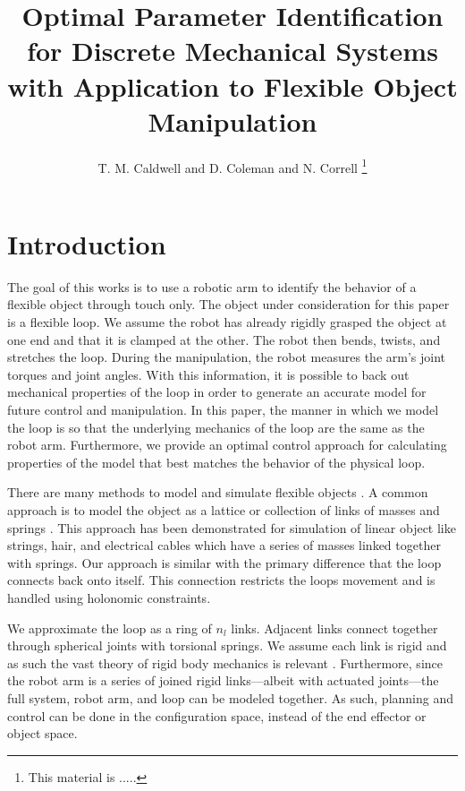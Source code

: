 \documentclass[letterpaper, 10pt, conference]{ieeeconf}
\title{Optimal Parameter Identification for Discrete Mechanical Systems with Application to Flexible Object Manipulation}
\author{T. M. Caldwell and  D. Coleman and N. Correll%
\thanks{
This material is .....}%
}
\begin{document}
\maketitle

\begin{abstract}




\end{abstract}

\section{Introduction}
The goal of this works is to use a robotic arm to identify the behavior of a flexible object through touch only.  The object under consideration for this paper is a flexible loop.  We assume the robot has already rigidly grasped the object at one end and that it is clamped at the other.  The robot then bends, twists, and stretches the loop.  During the manipulation, the robot measures the arm's joint torques and joint angles.  With this information, it is possible to back out mechanical properties of the loop in order to generate an accurate model for future control and manipulation.  In this paper, the manner in which we model the loop is so that the underlying mechanics of the loop are the same as the robot arm.  Furthermore, we provide an optimal control approach for calculating properties of the model that best matches the behavior of the physical loop.

There are many methods to model and simulate flexible objects \cite{khalil_payeur}.  A common approach is to model the object as a lattice or collection of links of masses and springs \cite{sahari_etal, wakamatsu_etal, khalil_payeur}.  This approach has been demonstrated for simulation of linear object like strings, hair, and electrical cables which have a series of masses linked together with springs.   Our approach is similar with the primary difference that the loop connects back onto itself.  This connection restricts the loops movement and is handled using holonomic constraints.  

We approximate the loop as a ring of $n_l$ links.  Adjacent links connect together through spherical joints with torsional springs. We assume each link is rigid and as such the vast theory of rigid body mechanics is relevant \cite{murray_li_sastry}.  Furthermore, since the robot arm is a series of joined rigid links---albeit with actuated joints---the full system, robot arm, and loop can be modeled together.  As such, planning and control can be done in the configuration space, instead of the end effector or object space. 
\end{document}
